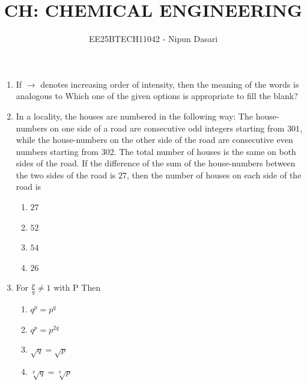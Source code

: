 \documentclass[journal,12pt,onecolumn]{IEEEtran}
\title{CH: CHEMICAL ENGINEERING}
\author{EE25BTECH11042 - Nipun Dasari}
\date{   }
\theoremstyle{remark}
\begin{document}
	
	
	\vspace{3cm}
	
	\maketitle
	\begin{enumerate}
		\item If $\to$ denotes increasing order of intensity, then the meaning of the words
		 is analogous to 
		Which one of the given options is appropriate to fill the blank?
		
		\hfill{}
		\begin{enumerate}
		\end{enumerate}
		
		\item In a locality, the houses are numbered in the following way: The house-numbers on one side of a road are consecutive odd integers starting from $301$, while the house-numbers on the other side of the road are consecutive even numbers starting from $302$. The total number of houses is the same on both sides of the road.
		If the difference of the sum of the house-numbers between the two sides of the road is $27$, then the number of houses on each side of the road is
		
		\hfill{\brak{\text{GATE GA 2024}}}
		\begin{enumerate}
			\item $27$
			\item $52$
			\item $54$
			\item $26$
		\end{enumerate}
		
		\item For $\frac{p}{q} \ne 1$ with P\underline{\hspace{2cm}}
		Then
		\begin{enumerate}
			\item $q^p = p^q$
			\item $q^p = p^{2q}$
			\item $\sqrt{q}=\sqrt{p}$
			\item $\sqrt[p]{q}=\sqrt[q]{p}$
		\end{enumerate}
		

\end{enumerate}
\end{document}
